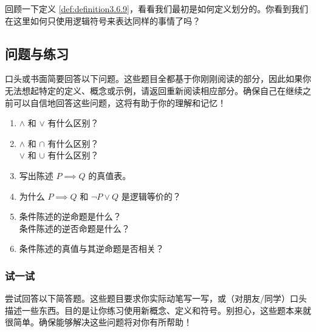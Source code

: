 回顾一下定义 \ref{def:definition3.6.9}，看看我们最初是如何定义划分的。你看到我们在这里如何只使用逻辑符号来表达同样的事情了吗？

\clearpage

\subsection{问题与练习}

口头或书面简要回答以下问题。这些题目全都基于你刚刚阅读的部分，因此如果你无法想起特定的定义、概念或示例，请返回重新阅读相应部分。确保自己在继续之前可以自信地回答这些问题，这将有助于你的理解和记忆！

\begin{enumerate}[label=(\arabic*)]
    \item $\land$ 和 $\lor$ 有什么区别？
    \item $\land$ 和 $\cap$ 有什么区别？\\
        $\lor$ 和 $\cup$ 有什么区别？
    \item 写出陈述 $P \implies Q$ 的真值表。
    \item 为什么 $P \implies Q$ 和 $\neg P \lor Q$ 是逻辑等价的？
    \item 条件陈述的逆命题是什么？\\
        条件陈述的逆否命题是什么？
    \item 条件陈述的真值与其逆命题是否相关？
\end{enumerate}

\subsubsection*{试一试}

尝试回答以下简答题。这些题目要求你实际动笔写一写，或（对朋友/同学）口头描述一些东西。目的是让你练习使用新概念、定义和符号。别担心，这些题本来就很简单。确保能够解决这些问题将对你有所帮助！

